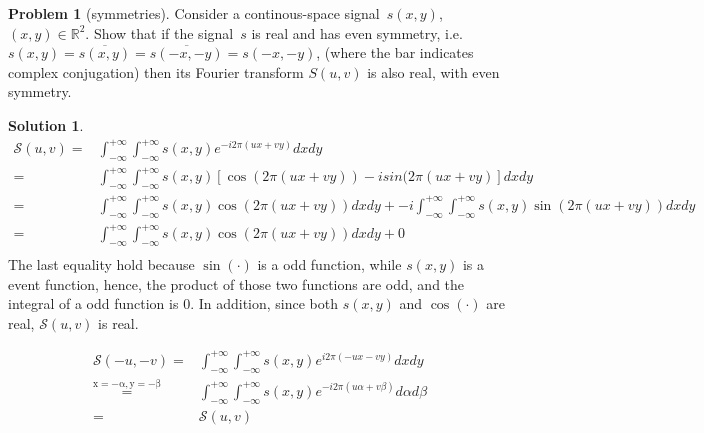 \documentclass[11pt]{article}
\theoremstyle{plain}
\theoremstyle{definition}
\newtheorem{problem}{Problem}
\newtheorem{solution}{Solution}
\theoremstyle{remark}
\begin{document}
\begin{problem}[symmetries]
Consider a continous-space signal~$s(x,y)$,
$(x,y)\in\mathbb{R}^2$. Show that if
the signal~$s$ is real and has even symmetry,
i.e.~$s(x,y)=\overline{s(x,y)}=\overline{s(-x,-y)}=s(-x,-y)$,
(where the bar indicates complex conjugation)
then its Fourier transform $S(u,v)$ is also real, with even symmetry.
\end{problem}
\begin{solution}
	\begin{eqnarray*}
		\mathcal{S}(u,v) =& \int_{-\infty}^{+\infty}  \int_{-\infty}^{+\infty} s(x,y) e^{-i 2\pi (ux +vy)} dxdy\\
		=& \int_{-\infty}^{+\infty}  \int_{-\infty}^{+\infty} s(x,y) [\cos(2\pi(ux+vy))-isin(2\pi(ux+vy)]dxdy\\
		=& \int_{-\infty}^{+\infty}  \int_{-\infty}^{+\infty} s(x,y) \cos(2\pi(ux+vy))dxdy + -i \int_{-\infty}^{+\infty}  \int_{-\infty}^{+\infty} s(x,y) \sin(2\pi(ux+vy))dxdy\\
		=& \int_{-\infty}^{+\infty}  \int_{-\infty}^{+\infty} s(x,y) \cos(2\pi(ux+vy))dxdy + 0\\
	\end{eqnarray*}
	The last equality hold because $\sin(\cdot)$ is a odd function, while $s(x,y)$ is a event function, hence, the product of those two functions are odd, and the integral of a odd function is $0$. In addition, since both $s(x,y)$ and $\cos(\cdot)$ are real, $\mathcal{S}(u,v)$ is real.
	
	\begin{eqnarray*}
		\mathcal{S}(-u, -v) = & \int_{-\infty}^{+\infty}  \int_{-\infty}^{+\infty} s(x,y) e^{i2\pi (-ux-vy)}dxdy \\
		\overset{\mathrm{x = -\alpha,  y = -\beta}}{=}  &  \int_{-\infty}^{+\infty}  \int_{-\infty}^{+\infty} s(x,y) e^{-i 2\pi (u\alpha + v\beta)} d\alpha d\beta \\
		=& \mathcal{S}(u,v)
	\end{eqnarray*}

\end{solution}
\end{document}
